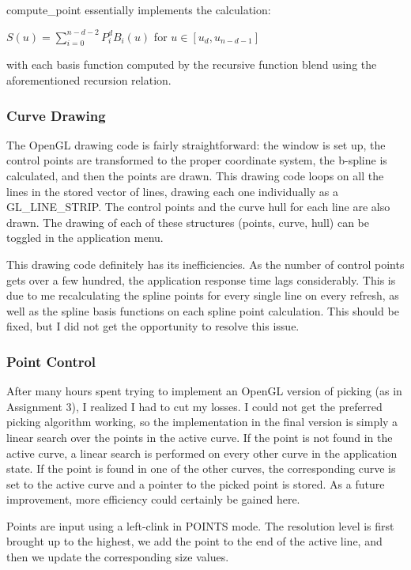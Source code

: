 \documentclass[11pt]{article}
\begin{document}
compute\_point essentially implements the calculation:
\begin{center}
$S(u) = \sum_{i=0}^{n-d-2} P_{i} ^{d}B_{i}(u)$ for $u \in [u_{d}, u_{n-d-1}]$
\end{center}
with each basis function computed by the recursive function blend using the aforementioned recursion relation.

\subsubsection{Curve Drawing}
\label{sec:curvedrawing}
The OpenGL drawing code is fairly straightforward: the window is set up, the control points are transformed to the proper coordinate system, the b-spline is calculated, and then the points are drawn. This drawing code loops on all the lines in the stored vector of lines, drawing each one individually as a GL\_LINE\_STRIP. The control points and the curve hull for each line are also drawn. The drawing of each of these structures (points, curve, hull) can be toggled in the application menu.

This drawing code definitely has its inefficiencies. As the number of control points gets over a few hundred, the application response time lags considerably. This is due to me recalculating the spline points for every single line on every refresh, as well as the spline basis functions on each spline point calculation. This should be fixed, but I did not get the opportunity to resolve this issue.

\subsubsection{Point Control}
\label{sec:pointcontrol}
After many hours spent trying to implement an OpenGL version of picking (as in Assignment 3), I realized I had to cut my losses. I could not get the preferred picking algorithm working, so the implementation in the final version is simply a linear search over the points in the active curve. If the point is not found in the active curve, a linear search is performed on every other curve in the application state. If the point is found in one of the other curves, the corresponding curve is set to the active curve and a pointer to the picked point is stored. As a future improvement, more efficiency could certainly be gained here.

Points are input using a left-clink in POINTS mode. The resolution level is first brought up to the highest, we add the point to the end of the active line, and then we update the corresponding size values.
\end{document}
